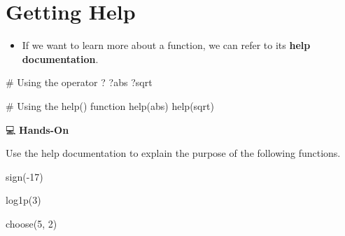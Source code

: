 \documentclass[
  letterpaper,
  DIV=11,
  numbers=noendperiod]{scrreprt}
\newenvironment{Shaded}{\begin{snugshade}}{\end{snugshade}}
\newcommand{\CommentTok}[1]{\textcolor[rgb]{0.37,0.37,0.37}{#1}}
\newcommand{\DecValTok}[1]{\textcolor[rgb]{0.68,0.00,0.00}{#1}}
\newcommand{\FunctionTok}[1]{\textcolor[rgb]{0.28,0.35,0.67}{#1}}
\newcommand{\NormalTok}[1]{\textcolor[rgb]{0.00,0.23,0.31}{#1}}
\newcommand{\SpecialCharTok}[1]{\textcolor[rgb]{0.37,0.37,0.37}{#1}}
\providecommand{\tightlist}{%
  \setlength{\itemsep}{0pt}\setlength{\parskip}{0pt}}\usepackage{longtable,booktabs,array}
\begin{document}
\section{Getting Help}\label{getting-help}

\begin{itemize}
\tightlist
\item
  If we want to learn more about a function, we can refer to its
  \textbf{help documentation}.
\end{itemize}

\begin{Shaded}
\begin{Highlighting}[]
\CommentTok{\# Using the operator \textquotesingle{}?\textquotesingle{}}
\NormalTok{?abs}
\NormalTok{?sqrt}

\CommentTok{\# Using the help() function}
\FunctionTok{help}\NormalTok{(abs)}
\FunctionTok{help}\NormalTok{(sqrt)}
\end{Highlighting}
\end{Shaded}

💻 \textbf{Hands-On}

Use the help documentation to explain the purpose of the following
functions.

\begin{Shaded}
\begin{Highlighting}[]
\FunctionTok{sign}\NormalTok{(}\SpecialCharTok{{-}}\DecValTok{17}\NormalTok{)}

\FunctionTok{log1p}\NormalTok{(}\DecValTok{3}\NormalTok{)}

\FunctionTok{choose}\NormalTok{(}\DecValTok{5}\NormalTok{, }\DecValTok{2}\NormalTok{)}
\end{Highlighting}
\end{Shaded}
\end{document}
